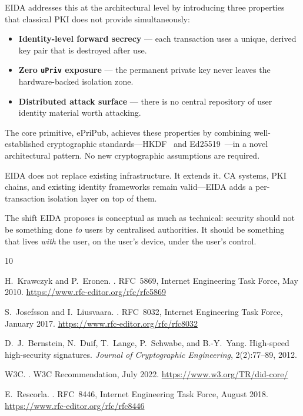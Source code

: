 \documentclass[11pt,a4paper]{article}
\begin{document}
EIDA addresses this at the architectural level by introducing three properties
that classical PKI does not provide simultaneously:
\begin{itemize}
  \item \textbf{Identity-level forward secrecy} --- each transaction uses a
        unique, derived key pair that is destroyed after use.
  \item \textbf{Zero \texttt{uPriv} exposure} --- the permanent private key
        never leaves the hardware-backed isolation zone.
  \item \textbf{Distributed attack surface} --- there is no central repository
        of user identity material worth attacking.
\end{itemize}

The core primitive, ePriPub, achieves these properties by combining
well-established cryptographic standards---HKDF~\cite{RFC5869} and
Ed25519~\cite{RFC8032}---in a novel architectural pattern.  No new
cryptographic assumptions are required.

EIDA does not replace existing infrastructure.  It extends it.  CA systems,
PKI chains, and existing identity frameworks remain valid---EIDA adds a
per-transaction isolation layer on top of them.

The shift EIDA proposes is conceptual as much as technical: security should
not be something done \emph{to} users by centralised authorities.  It should
be something that lives \emph{with} the user, on the user's device, under the
user's control.


\begin{thebibliography}{10}

H.~Krawczyk and P.~Eronen.
.
\newblock RFC~5869, Internet Engineering Task Force, May 2010.
\newblock \url{https://www.rfc-editor.org/rfc/rfc5869}

S.~Josefsson and I.~Liusvaara.
.
\newblock RFC~8032, Internet Engineering Task Force, January 2017.
\newblock \url{https://www.rfc-editor.org/rfc/rfc8032}

D.~J.~Bernstein, N.~Duif, T.~Lange, P.~Schwabe, and B.-Y.~Yang.
\newblock High-speed high-security signatures.
\newblock \emph{Journal of Cryptographic Engineering}, 2(2):77--89, 2012.

{W3C}.
.
\newblock W3C Recommendation, July 2022.
\newblock \url{https://www.w3.org/TR/did-core/}

E.~Rescorla.
.
\newblock RFC~8446, Internet Engineering Task Force, August 2018.
\newblock \url{https://www.rfc-editor.org/rfc/rfc8446}

\end{thebibliography}
\end{document}
